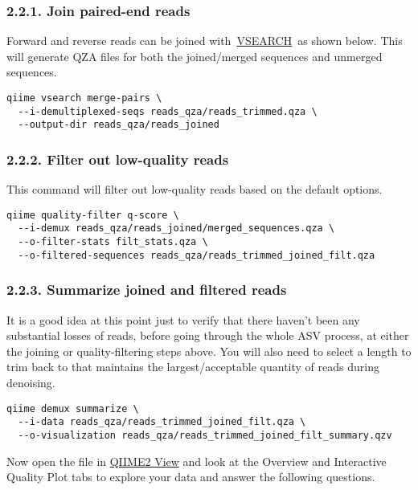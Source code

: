 \documentclass[
]{book}
\begin{document}
\subsubsection{2.2.1. Join paired-end reads}\label{join-paired-end-reads-1}

Forward and reverse reads can be joined with~\href{https://github.com/torognes/vsearch}{VSEARCH}~as shown below. This will generate QZA files for both the joined/merged sequences and unmerged sequences.

\begin{verbatim}
qiime vsearch merge-pairs \
  --i-demultiplexed-seqs reads_qza/reads_trimmed.qza \
  --output-dir reads_qza/reads_joined
\end{verbatim}

\subsubsection{2.2.2. Filter out low-quality reads}\label{filter-out-low-quality-reads-1}

This command will filter out low-quality reads based on the default options.

\begin{verbatim}
qiime quality-filter q-score \
  --i-demux reads_qza/reads_joined/merged_sequences.qza \
  --o-filter-stats filt_stats.qza \
  --o-filtered-sequences reads_qza/reads_trimmed_joined_filt.qza
\end{verbatim}

\subsubsection{2.2.3. Summarize joined and filtered reads}\label{summarize-joined-and-filtered-reads-1}

It is a good idea at this point just to verify that there haven't been any substantial losses of reads, before going through the whole ASV process, at either the joining or quality-filtering steps above. You will also need to select a length to trim back to that maintains the largest/acceptable quantity of reads during denoising.

\begin{verbatim}
qiime demux summarize \
  --i-data reads_qza/reads_trimmed_joined_filt.qza \
  --o-visualization reads_qza/reads_trimmed_joined_filt_summary.qzv
\end{verbatim}

Now open the file in \href{https://view.qiime2.org/}{QIIME2 View} and look at the Overview and Interactive Quality Plot tabs to explore your data and answer the following questions.
\end{document}
